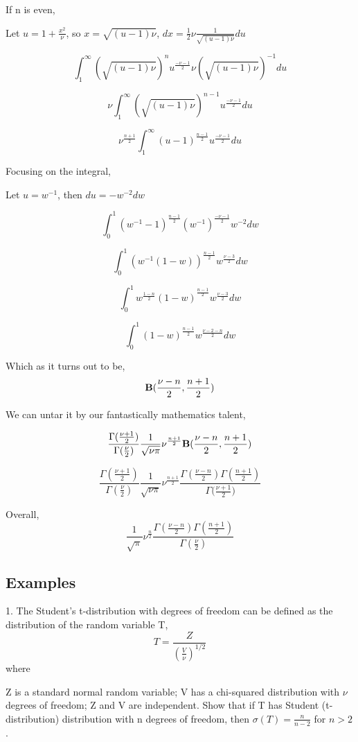 \documentclass{article}
\begin{document}
If n is even,

Let $u = 1+\frac{x^2}{\nu}$, so $x = \sqrt{(u-1) \nu}$, $dx = \frac{1}{2}\nu \frac{1}{\sqrt{(u-1) \nu}}du$

$$ \int_{1}^{\infty} ( \sqrt{(u-1) \nu})^n {u^{\frac{-\nu-1}{2}}} \nu{(\sqrt{(u-1) \nu})}^{-1}du$$

$$ \nu \int_{1}^{\infty} ( \sqrt{(u-1) \nu})^{n-1} {u^{\frac{-\nu-1}{2}}}  du$$

$$  \nu^{\frac{n+1}{2}} \int_{1}^{\infty} {(u-1)}^{\frac{n-1}{2}} {u^{\frac{-\nu-1}{2}}}  du$$

Focusing on the integral,

Let $u = w^{-1}$, then $du = -w^{-2} dw$

$$\int_{0}^{1} {(w^{-1}-1)}^{\frac{n-1}{2}} {(w^{-1})^{\frac{-\nu-1}{2}}}  w^{-2} dw$$

$$\int_{0}^{1} {(w^{-1}(1-w))}^{\frac{n-1}{2}} {w^{\frac{\nu-3}{2}}}   dw$$

$$\int_{0}^{1} {w^{\frac{1-n}{2}} (1-w)}^{\frac{n-1}{2}} {w^{\frac{\nu-3}{2}}}   dw$$

$$\int_{0}^{1} { (1-w)}^{\frac{n-1}{2}} {w^{\frac{\nu-2-n}{2}}}   dw$$

Which as it turns out to be, 
$${\bf B}(\frac{\nu-n}{2},\frac{n+1}{2})$$

We can untar it by our fantastically mathematics talent, 

$$ \frac{\Gamma(\frac{\nu+1}{2})}{\Gamma(\frac{\nu}{2})} \frac{1}{\sqrt{\nu \pi}} \nu^{\frac{n+1}{2}} {\bf B}(\frac{\nu-n}{2},\frac{n+1}{2})$$


$$ \frac{\Gamma(\frac{\nu+1}{2})}{\Gamma(\frac{\nu}{2})} \frac{1}{\sqrt{\nu \pi}} \nu^{\frac{n+1}{2}} \frac{\Gamma(\frac{\nu-n}{2})\Gamma(\frac{n+1}{2})}{\Gamma{(\frac{\nu+1}{2}})}$$

Overall,
$$  \frac{1}{\sqrt{ \pi}} \nu^{\frac{n}{2}} \frac{\Gamma(\frac{\nu-n}{2})\Gamma(\frac{n+1}{2})}{\Gamma(\frac{\nu}{2})}$$

\subsection{Examples}

1. The Student's t-distribution with  degrees of freedom can be defined as the distribution of the random variable T,
$$T = \frac{Z}{(\frac{V}{\nu})^{1/2}}$$
where

Z  is a standard normal random variable;
V  has a chi-squared distribution with $\nu$ degrees of freedom;
Z and V are independent.
Show that if T has Student (t-distribution) distribution with n degrees of freedom, then $\sigma{(T)} = \frac{n}{n-2}$ for $n>2$.
\end{document}
